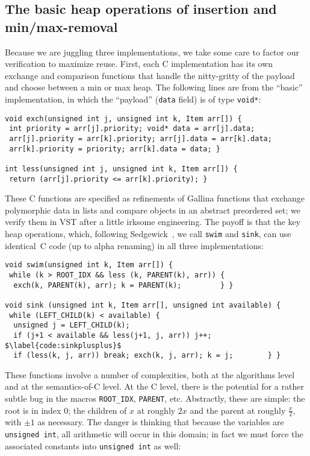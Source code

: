 \subsection{The basic heap operations of insertion and min/max-removal}
\label{sec:heapinsertremove}

Because we are juggling three implementations, we take some care to factor our verification to maximize reuse.  First, each C implementation has its own exchange and comparison functions that handle the nitty-gritty of the payload and choose between a min or max heap.  The following lines are from the ``basic'' implementation, in which the ``payload'' (\texttt{data} field) is of type \texttt{void*}:
\begin{lstlisting}
void exch(unsigned int j, unsigned int k, Item arr[]) {
 int priority = arr[j].priority; void* data = arr[j].data;
 arr[j].priority = arr[k].priority; arr[j].data = arr[k].data;
 arr[k].priority = priority; arr[k].data = data; }

int less(unsigned int j, unsigned int k, Item arr[]) {
 return (arr[j].priority <= arr[k].priority); }
\end{lstlisting}
These C functions are specified as refinements of Gallina functions that exchange polymorphic data in lists and compare objects in an abstract preordered set; we verify them in VST after a little irksome engineering.  The payoff is that the key heap operations, which, following Sedgewick~\cite{sedgewick}, we call \texttt{swim} and \texttt{sink}, can use identical~C code (up to alpha renaming) in all three implementations:
\begin{lstlisting}
void swim(unsigned int k, Item arr[]) {
 while (k > ROOT_IDX && less (k, PARENT(k), arr)) {
  exch(k, PARENT(k), arr); k = PARENT(k);         } }

void sink (unsigned int k, Item arr[], unsigned int available) {
 while (LEFT_CHILD(k) < available) {
  unsigned j = LEFT_CHILD(k);
  if (j+1 < available && less(j+1, j, arr)) j++; $\label{code:sinkplusplus}$
  if (less(k, j, arr)) break; exch(k, j, arr); k = j;        } }
\end{lstlisting}
These functions involve a number of complexities, both at the algorithms level and at the semantics-of-C level.  At the C level, there is the potential for a rather subtle bug in the macros \texttt{ROOT\_IDX}, \texttt{PARENT}, etc.  Abstractly, these are simple: the root is in index 0; the children of $x$ at roughly $2x$ and the parent at roughly $\frac{x}{2}$, with $\pm1$ as necessary.  The danger is thinking that because the variables are \texttt{unsigned int}, all arithmetic will occur in this domain; in fact we must force the associated constants into \texttt{unsigned int} as well:
